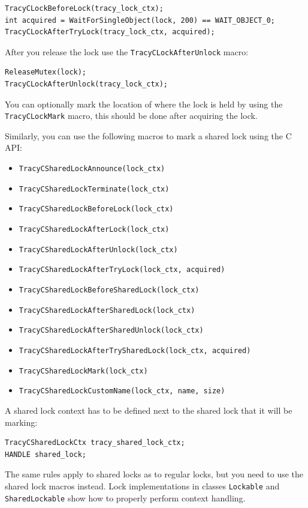 \documentclass[hidelinks,titlepage,a4paper,twoside]{article}
\begin{document}
\begin{lstlisting}
TracyCLockBeforeLock(tracy_lock_ctx);
int acquired = WaitForSingleObject(lock, 200) == WAIT_OBJECT_0;
TracyCLockAfterTryLock(tracy_lock_ctx, acquired);
\end{lstlisting}

After you release the lock use the \texttt{TracyCLockAfterUnlock} macro:

\begin{lstlisting}
ReleaseMutex(lock);
TracyCLockAfterUnlock(tracy_lock_ctx);
\end{lstlisting}

You can optionally mark the location of where the lock is held by using the \texttt{TracyCLockMark} macro, this should be done after acquiring the lock.

Similarly, you can use the following macros to mark a shared lock using the C API:
\begin{itemize}
\item \texttt{TracyCSharedLockAnnounce(lock\_ctx)}
\item \texttt{TracyCSharedLockTerminate(lock\_ctx)}
\item \texttt{TracyCSharedLockBeforeLock(lock\_ctx)}
\item \texttt{TracyCSharedLockAfterLock(lock\_ctx)}
\item \texttt{TracyCSharedLockAfterUnlock(lock\_ctx)}
\item \texttt{TracyCSharedLockAfterTryLock(lock\_ctx, acquired)}
\item \texttt{TracyCSharedLockBeforeSharedLock(lock\_ctx)}
\item \texttt{TracyCSharedLockAfterSharedLock(lock\_ctx)}
\item \texttt{TracyCSharedLockAfterSharedUnlock(lock\_ctx)}
\item \texttt{TracyCSharedLockAfterTrySharedLock(lock\_ctx, acquired)}
\item \texttt{TracyCSharedLockMark(lock\_ctx)}
\item \texttt{TracyCSharedLockCustomName(lock\_ctx, name, size)}
\end{itemize}

A shared lock context has to be defined next to the shared lock that it will be marking:
\begin{lstlisting}
TracyCSharedLockCtx tracy_shared_lock_ctx;
HANDLE shared_lock;
\end{lstlisting}

The same rules apply to shared locks as to regular locks, but you need to use the shared lock macros instead.
Lock implementations in classes \texttt{Lockable} and \texttt{SharedLockable} show how to properly perform context handling.
\end{document}
